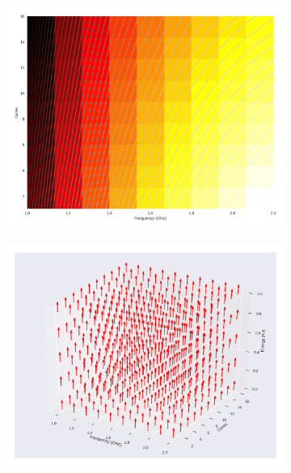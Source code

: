 \begin{figure}[H]

	\centering

	\begin{subfigure}[b]{0.45\textwidth}

		\includegraphics[width=\textwidth]{models/figures/analisys/w0.png}

	\end{subfigure}


	\begin{subfigure}[b]{0.45\textwidth}

		\includegraphics[width=\textwidth]{models/figures/analisys/w0_3d.png}

	\end{subfigure}

\end{figure}


